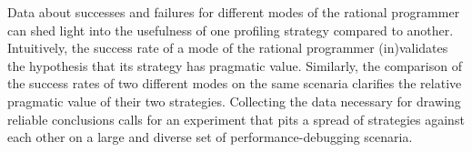 Data about successes and failures for different modes of the rational
programmer can shed light into the usefulness of one profiling strategy
compared to another.  Intuitively, the success rate of a mode of the
rational programmer (in)validates the hypothesis that its strategy has
pragmatic value. Similarly, the comparison of the  success rates of two
different modes on the same scenaria clarifies the relative pragmatic
value of their two strategies. Collecting the data necessary for drawing
reliable conclusions calls for an experiment that pits a spread
of strategies against each other on a large and diverse set of
performance-debugging scenaria.




